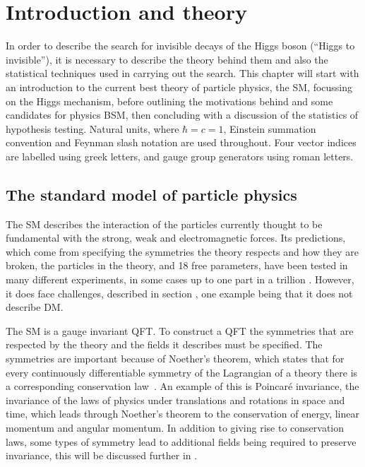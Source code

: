 \chapter{Introduction and theory}
\label{chap:theory}
In order to describe the search for invisible decays of the Higgs boson (``Higgs to invisible''), it is necessary to describe the theory behind them and also the statistical techniques used in carrying out the search. This chapter will start with an introduction to the current best theory of particle physics, the \ac{SM}, focussing on the Higgs mechanism, before outlining the motivations behind and some candidates for physics \ac{BSM}, then concluding with a discussion of the statistics of hypothesis testing. Natural units, where $\hbar=c=1$, Einstein summation convention and Feynman slash notation are used throughout. Four vector indices are labelled using greek letters, and gauge group generators using roman letters.


\section{The standard model of particle physics}
\label{sec:SM}
The SM describes the interaction of the particles currently thought to be fundamental with the strong, weak and electromagnetic forces. Its predictions, which come from specifying the symmetries the theory respects and how they are broken, the particles in the theory, and 18 free parameters, have been tested in many different experiments, in some cases up to one part in a trillion \cite{PhysRevLett.100.120801}. However, it does face challenges, described in section , one example being that it does not describe \ac{DM}. 

The SM is a gauge invariant \ac{QFT}. To construct a QFT the symmetries that are respected by the theory and the fields it describes must be specified. The symmetries are important because of Noether's theorem, which states that for every continuously differentiable symmetry of the Lagrangian of a theory there is a corresponding conservation law~\cite{Noether:1918zz,doi:10.1080/00411457108231446}. An example of this is Poincar\'e invariance, the invariance of the laws of physics under translations and rotations in space and time, which leads through Noether's theorem to the conservation of energy, linear momentum and angular momentum. In addition to giving rise to conservation laws, some types of symmetry lead to additional fields being required to preserve invariance, this will be discussed further in  \cite{PhysRev.96.191}.

